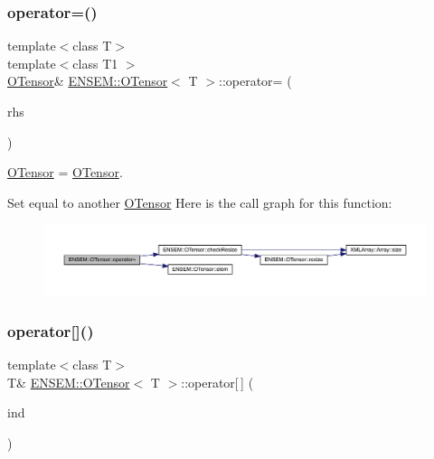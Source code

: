 \subsubsection{\texorpdfstring{operator=()}{operator=()}\hspace{0.1cm}{\footnotesize\ttfamily [12/12]}}
{\footnotesize\ttfamily template$<$class T$>$ \\
template$<$class T1 $>$ \\
\mbox{\hyperlink{classENSEM_1_1OTensor}{O\+Tensor}}\& \mbox{\hyperlink{classENSEM_1_1OTensor}{E\+N\+S\+E\+M\+::\+O\+Tensor}}$<$ T $>$\+::operator= (\begin{DoxyParamCaption}\item[{const \mbox{\hyperlink{classENSEM_1_1OTensor}{O\+Tensor}}$<$ T1 $>$ \&}]{rhs }\end{DoxyParamCaption})\hspace{0.3cm}{\ttfamily [inline]}}



\mbox{\hyperlink{classENSEM_1_1OTensor}{O\+Tensor}} = \mbox{\hyperlink{classENSEM_1_1OTensor}{O\+Tensor}}. 

Set equal to another \mbox{\hyperlink{classENSEM_1_1OTensor}{O\+Tensor}} Here is the call graph for this function\+:
\nopagebreak
\begin{figure}[H]
\begin{center}
\leavevmode
\includegraphics[width=350pt]{da/d8a/classENSEM_1_1OTensor_a96fac7277ac1df849789d53b761e5e68_cgraph}
\end{center}
\end{figure}
\mbox{\label{classENSEM_1_1OTensor_adbfded2bb2af9d68e0a040df0d19b2d6}} 
\subsubsection{\texorpdfstring{operator[]()}{operator[]()}\hspace{0.1cm}{\footnotesize\ttfamily [1/6]}}
{\footnotesize\ttfamily template$<$class T$>$ \\
T\& \mbox{\hyperlink{classENSEM_1_1OTensor}{E\+N\+S\+E\+M\+::\+O\+Tensor}}$<$ T $>$\+::operator\mbox{[}$\,$\mbox{]} (\begin{DoxyParamCaption}\item[{const \mbox{\hyperlink{classXMLArray_1_1Array}{Array}}$<$ int $>$ \&}]{ind }\end{DoxyParamCaption})\hspace{0.3cm}{\ttfamily [inline]}}



